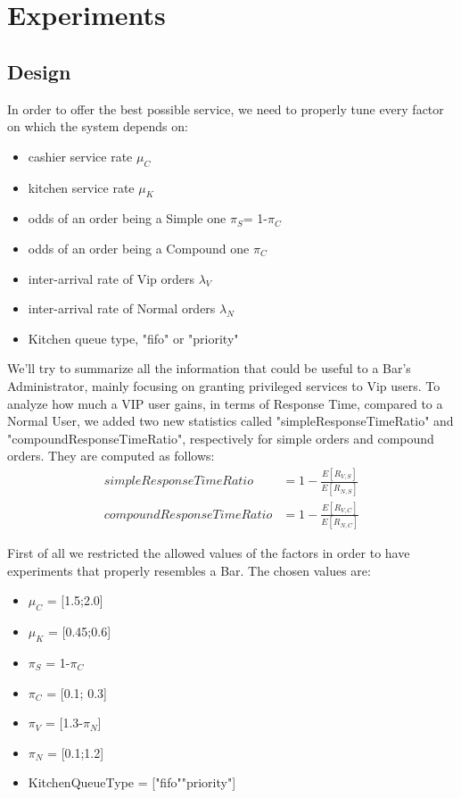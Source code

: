 \section{Experiments}

\subsection{Design}
In order to offer the best possible service, we need to properly tune every factor on which the system depends on:
\begin{itemize}
    \item cashier service rate $\mu_C$
    \item kitchen service rate $\mu_K$
    \item odds of an order being a Simple one $\pi_S$= 1-$\pi_C$ 
    \item odds of an order being a Compound one $\pi_C$ 
    \item inter-arrival rate of Vip orders $\lambda_V$
    \item inter-arrival rate of Normal orders $\lambda_N$
    \item Kitchen queue type, "fifo" or "priority"
\end{itemize}

We'll try to summarize all the information that could be useful to a Bar's Administrator, mainly focusing on granting privileged services to Vip users.
To analyze how much a VIP user gains, in terms of Response Time, compared to a Normal User, we added two new statistics called "simpleResponseTimeRatio" and "compoundResponseTimeRatio", respectively for simple orders and compound orders. They are computed as follows:
\begin{align}
    simpleResponseTimeRatio &= 1-{\frac{E[R_{V,S}]}{E[R_{N,S}]}} \\
    compoundResponseTimeRatio &= 1-{\frac{E[R_{V,C}]}{E[R_{N,C}]}}
\end{align}

First of all we restricted the allowed values of the factors in order to have  experiments that properly resembles a Bar. The chosen values are:
    \begin{itemize}
    \item $\mu_C$ = [1.5;2.0]
    \item $\mu_K$ = [0.45;0.6]
    \item $\pi_S$ = 1-$\pi_C$
    \item $\pi_C$ = [0.1; 0.3]
    \item $\pi_V$ = [1.3-$\pi_N$]
    \item $\pi_N$ = [0.1;1.2]
    \item KitchenQueueType = ["fifo""priority"]
  \end{itemize}



